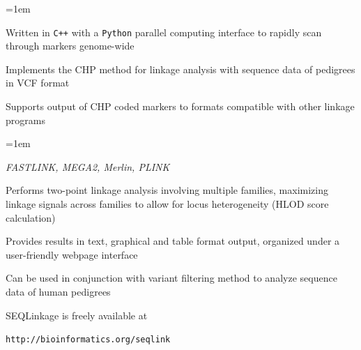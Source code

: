 \documentclass[ansiepaper, portrait, fontscale=0.35]{baposter} %
\newcommand{\cir}[1]{%
\tikz{\useasboundingbox (-0.2em,-0.32em) rectangle(0.2em,0.32em); \draw[draw=BaylorBurgundy,fill=BaylorBurgundy!#1!white,line width=0.03em] (0,0) circle(0.2em);}}
\newcommand{\tri}{\color{BaylorBurgundy}{$\triangleright$}}
\newcommand{\clist}[1]{%
\begin{list}{\labelitemi}{\leftmargin=1em}
\setlength{\parindent}{5em}
\setlength{\itemsep}{0.2em}
\setlength{\parskip}{0em}
\setlength{\parsep}{0em}
#1
\end{list}
}
\begin{document}
\begin{poster}
{    \clist{
      \item[\cir{100}] Written in \texttt{C++} with a \texttt{Python} parallel computing interface to rapidly scan through markers genome-wide
      \item[\cir{100}] Implements the CHP method for linkage analysis with sequence data of pedigrees in VCF format
      \item[\cir{100}] Supports output of CHP coded markers to formats compatible with other linkage programs
             \clist{
              \item[\tri] \textit{FASTLINK, MEGA2, Merlin, PLINK}
              }
      \item[\cir{100}] Performs two-point linkage analysis involving multiple families, maximizing linkage signals across families to allow for locus heterogeneity (HLOD score calculation)
      \item[\cir{100}] Provides results in text, graphical and table format output, organized under a user-friendly webpage interface
      \item[\cir{100}] Can be used in conjunction with variant filtering method to analyze sequence data of human pedigrees
    }
  SEQLinkage is freely available at
  \begin{center}
  \texttt{http://bioinformatics.org/seqlink} 
  \end{center}
  }
\end{poster}
\end{document}
